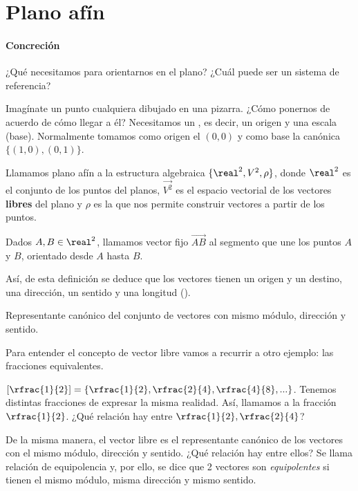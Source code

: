 \section{Plano afín}

\paragraph{Concreción}

¿Qué necesitamos para orientarnos en el plano? ¿Cuál puede ser un sistema de referencia? 

Imagínate un punto cualquiera dibujado en una pizarra. ¿Cómo ponernos de acuerdo de cómo llegar a él? Necesitamos un , es decir, un origen y una escala (base). Normalmente tomamos como origen el $(0,0)$ y como base la canónica $\{(1,0),(0,1)\}$.

\begin{defn}
Llamamos plano afín a la estructura algebraica $\{\real^2,V^2,\rho\}$, donde $\real^2$ es el conjunto de los puntos del  planos, $\vec{V^2}$ es el espacio vectorial de los vectores \textbf{libres} del plano y $\rho$ es la  que nos permite construir vectores a partir de los puntos.
\end{defn}


\begin{defn}
Dados $A,B\in\real^2$, llamamos vector fijo $\vec{AB}$ al segmento que une los puntos $A$ y $B$, orientado desde $A$ hasta $B$.
\end{defn}

Así, de esta definición se deduce que los vectores tienen un origen y un destino, una dirección, un sentido y una longitud (). 


\begin{defn}
Representante canónico del conjunto de vectores con mismo módulo, dirección y sentido.
\end{defn}

Para entender el concepto de vector libre vamos a recurrir a otro ejemplo: las fracciones equivalentes.

$[\rfrac{1}{2}] = \{\rfrac{1}{2},\rfrac{2}{4},\rfrac{4}{8},...\}$. Tenemos distintas fracciones  de expresar la misma realidad. Así, llamamos  a la fracción $\rfrac{1}{2}$. ¿Qué relación hay entre $\rfrac{1}{2},\rfrac{2}{4}$? 

De la misma manera, el vector libre es el representante canónico de los vectores con el mismo módulo, dirección y sentido. ¿Qué relación hay entre ellos? Se llama relación de equipolencia y, por ello, se dice que 2 vectores son \textit{equipolentes} si tienen el mismo módulo, misma dirección y mismo sentido.
 



